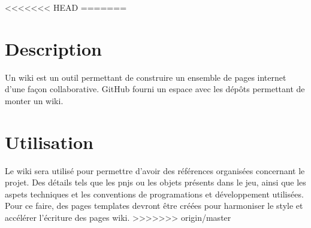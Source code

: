 <<<<<<< HEAD
=======
\section{Description}
Un wiki est un outil permettant de construire un ensemble de pages internet d'une façon collaborative. GitHub fourni un espace avec les dépôts permettant de monter un wiki.
\section{Utilisation}
Le wiki sera utilisé pour permettre d'avoir des références organisées concernant le projet. Des détails tels que les pnjs ou les objets présents dans le jeu, ainsi que les aspets techniques et les conventions de programations et développement utilisées.
Pour ce faire, des pages templates devront être créées pour harmoniser le style et accélérer l'écriture des pages wiki.
>>>>>>> origin/master
